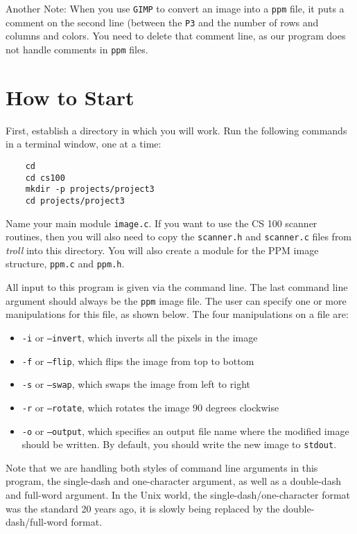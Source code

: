 \documentclass[12pt]{article}
\begin{document}
Another Note:  When you use {\tt GIMP} to convert an image into
a {\tt ppm} file, it puts
a comment on the second line (between the {\tt P3} and the number of rows and
columns and colors.  You need to delete that comment line, as our program
does not handle comments in {\tt ppm} files.

\section*{How to Start}

First, establish a directory in which you will work.
Run the following commands in a terminal window, one at a time:

\begin{verbatim}
    cd
    cd cs100
    mkdir -p projects/project3
    cd projects/project3
\end{verbatim}

Name your main module {\tt image.c}.
If you want to use the CS 100 scanner routines, then you
will also need to copy the {\tt scanner.h} and
{\tt scanner.c} files from {\it troll} into this directory.
You will also create a module for the PPM image structure, 
{\tt ppm.c} and {\tt ppm.h}.

All input to this program is given via the command line.  The last
command line argument should always be the {\tt ppm} image file.
The user can specify one or more manipulations for this file,
as shown below.  The four manipulations on a file are:

\begin{itemize}
\item {\tt -i} or {\tt --invert}, which inverts all the pixels
in the image
\item {\tt -f} or {\tt --flip}, which flips the image from top
to bottom
\item {\tt -s} or {\tt --swap}, which swaps the image from left
to right
\item {\tt -r} or {\tt --rotate}, which rotates the image
90 degrees clockwise
\item {\tt -o} or {\tt --output}, which specifies an output
file name where the modified image should be written.  By
default, you should write the new image to {\tt stdout}.
\end{itemize}

Note that we are handling both styles of command line arguments
in this program, the single-dash and one-character argument, as
well as a double-dash and full-word argument.  In the Unix
world, the single-dash/one-character format was the standard
20 years ago, it is slowly being replaced by the double-dash/full-word
format.
\end{document}
